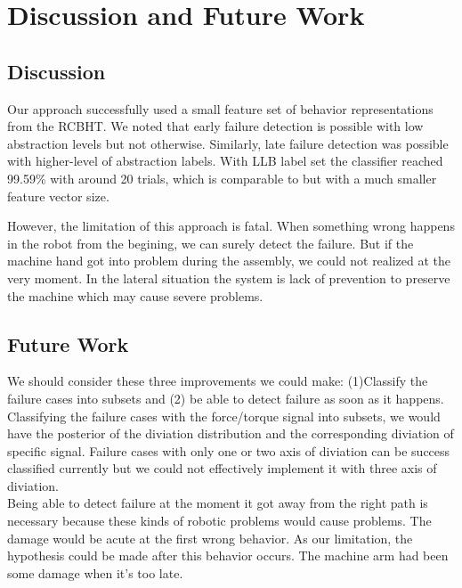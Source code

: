 \chapter{Discussion and Future Work}
\section{Discussion}
Our approach successfully used a small feature set of behavior representations from the RCBHT. We noted that early failure detection is possible with low abstraction levels but not otherwise. Similarly, late failure detection was possible with higher-level of abstraction labels. With LLB label set the classifier reached 99.59\% with around 20 trials, which is comparable to \cite{masonfailure} but with a much smaller feature vector size. 

\indent However, the limitation of this approach is fatal. When something wrong happens in the robot from the begining, we can surely detect the failure. But if the machine hand got into problem during the assembly, we could not realized at the very moment. In the lateral situation the system is lack of prevention to preserve the machine which may cause severe problems. \\

\section{Future Work}
We should consider these three improvements we could make: (1)Classify the failure cases into subsets and (2) be able to detect failure as soon as it happens.\\ 
\indent Classifying the failure cases with the force/torque signal into subsets, we would have the posterior of the diviation distribution and the corresponding diviation of specific signal. Failure cases with only one or two axis of diviation can be success classified currently but we could not effectively implement it with three axis of diviation. \\
\indent Being able to detect failure at the moment it got away from the right path is necessary because these kinds of robotic problems would cause problems. The damage would be acute at the first wrong behavior. As our limitation, the hypothesis could be made after this behavior occurs. The machine arm had been some damage when it's too late.\\ 
